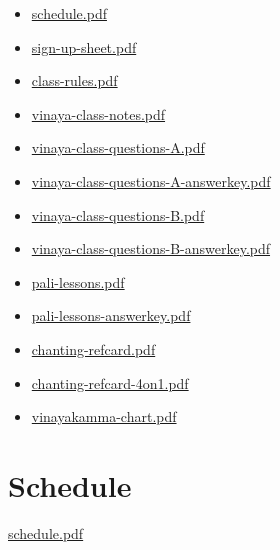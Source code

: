 \begin{itemize}
\tightlist
\item
  \href{./includes/docs/schedule.pdf}{schedule.pdf}
\item
  \href{./includes/docs/sign-up-sheet.pdf}{sign-up-sheet.pdf}
\item
  \href{./includes/docs/class-rules.pdf}{class-rules.pdf}
\item
  \href{./includes/docs/vinaya-class-notes.pdf}{vinaya-class-notes.pdf}
\item
  \href{./includes/docs/vinaya-class-questions-A.pdf}{vinaya-class-questions-A.pdf}
\item
  \href{./includes/docs/vinaya-class-questions-A-answerkey.pdf}{vinaya-class-questions-A-answerkey.pdf}
\item
  \href{./includes/docs/vinaya-class-questions-B.pdf}{vinaya-class-questions-B.pdf}
\item
  \href{./includes/docs/vinaya-class-questions-B-answerkey.pdf}{vinaya-class-questions-B-answerkey.pdf}
\item
  \href{./includes/docs/pali-lessons.pdf}{pali-lessons.pdf}
\item
  \href{./includes/docs/pali-lessons-answerkey.pdf}{pali-lessons-answerkey.pdf}
\item
  \href{./includes/docs/chanting-refcard.pdf}{chanting-refcard.pdf}
\item
  \href{./includes/docs/chanting-refcard-4on1.pdf}{chanting-refcard-4on1.pdf}
\item
  \href{./includes/docs/vinayakamma-chart.pdf}{vinayakamma-chart.pdf}
\end{itemize}

\section{Schedule}

\href{./includes/docs/schedule.pdf}{schedule.pdf}

